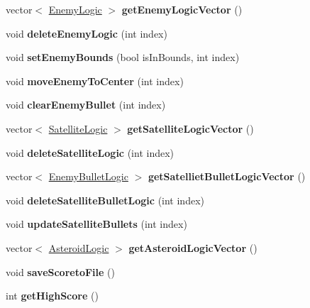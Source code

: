 \begin{DoxyCompactItemize}
vector$<$ \hyperlink{class_enemy_logic}{Enemy\+Logic} $>$ {\bfseries get\+Enemy\+Logic\+Vector} ()
\item 
\mbox{\label{class_game_logic_a34fd5f74aec0365dff0631384740a45b}} 
void {\bfseries delete\+Enemy\+Logic} (int index)
\item 
\mbox{\label{class_game_logic_a48f8e18378ed00053d83da991fcad264}} 
void {\bfseries set\+Enemy\+Bounds} (bool is\+In\+Bounds, int index)
\item 
\mbox{\label{class_game_logic_af355faaa66630a76a14ef0d7dc5adb54}} 
void {\bfseries move\+Enemy\+To\+Center} (int index)
\item 
\mbox{\label{class_game_logic_aa8b94076dcd3ad6419c50d0036af97d6}} 
void {\bfseries clear\+Enemy\+Bullet} (int index)
\item 
\mbox{\label{class_game_logic_a1110f512d8382700d322c6f1895810ea}} 
vector$<$ \hyperlink{class_satellite_logic}{Satellite\+Logic} $>$ {\bfseries get\+Satellite\+Logic\+Vector} ()
\item 
\mbox{\label{class_game_logic_a3954ee824ac3acc8753f61f97d41ce89}} 
void {\bfseries delete\+Satellite\+Logic} (int index)
\item 
\mbox{\label{class_game_logic_a230c5fb0084aa73c3b689c18a72b6adf}} 
vector$<$ \hyperlink{class_enemy_bullet_logic}{Enemy\+Bullet\+Logic} $>$ {\bfseries get\+Satelliet\+Bullet\+Logic\+Vector} ()
\item 
\mbox{\label{class_game_logic_a4527756097ff2039fd91daad430e8598}} 
void {\bfseries delete\+Satellite\+Bullet\+Logic} (int index)
\item 
\mbox{\label{class_game_logic_a353d4a44a09214c0ed73aa3a26b2ce0d}} 
void {\bfseries update\+Satellite\+Bullets} (int index)
\item 
\mbox{\label{class_game_logic_a084386ea39d66e3963ba248f7affabe0}} 
vector$<$ \hyperlink{class_asteroid_logic}{Asteroid\+Logic} $>$ {\bfseries get\+Asteroid\+Logic\+Vector} ()
\item 
\mbox{\label{class_game_logic_a594da37684d54d619214e8f96b80279c}} 
void {\bfseries save\+Scoreto\+File} ()
\item 
\mbox{\label{class_game_logic_a05ad3bbd5acd9f0b41d1f1d29cac8017}} 
int {\bfseries get\+High\+Score} ()
\end{DoxyCompactItemize}


